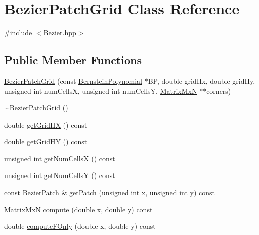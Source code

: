 \hypertarget{class_bezier_patch_grid}{\section{Bezier\-Patch\-Grid Class Reference}
\label{class_bezier_patch_grid}
}


{\ttfamily \#include $<$Bezier.\-hpp$>$}

\subsection*{Public Member Functions}
\begin{DoxyCompactItemize}
\item 
\hyperlink{class_bezier_patch_grid_a554a55115356412abc18baec436188be}{Bezier\-Patch\-Grid} (const \hyperlink{class_bernstein_polynomial}{Bernstein\-Polynomial} $\ast$B\-P, double grid\-Hx, double grid\-Hy, unsigned int num\-Cells\-X, unsigned int num\-Cells\-Y, \hyperlink{class_matrix_mx_n}{Matrix\-Mx\-N} $\ast$$\ast$corners)
\item 
\hyperlink{class_bezier_patch_grid_a2d05668c85a89cc22ecec7527dc61fb6}{$\sim$\-Bezier\-Patch\-Grid} ()
\item 
double \hyperlink{class_bezier_patch_grid_a097dc86c745cf672dae184ba638a575f}{get\-Grid\-H\-X} () const 
\item 
double \hyperlink{class_bezier_patch_grid_a415ab4140e78d397cf102ec7a349c858}{get\-Grid\-H\-Y} () const 
\item 
unsigned int \hyperlink{class_bezier_patch_grid_a68d5e67e34eb2290e3dc66aad978003a}{get\-Num\-Cells\-X} () const 
\item 
unsigned int \hyperlink{class_bezier_patch_grid_a527f5f89d884c8c496b87cd733bd5e57}{get\-Num\-Cells\-Y} () const 
\item 
const \hyperlink{class_bezier_patch}{Bezier\-Patch} \& \hyperlink{class_bezier_patch_grid_a9e9c8bbdad683ca8a9afba393c105223}{get\-Patch} (unsigned int x, unsigned int y) const 
\item 
\hyperlink{class_matrix_mx_n}{Matrix\-Mx\-N} \hyperlink{class_bezier_patch_grid_a255a33e2613464997d2afee32bc549ab}{compute} (double x, double y) const 
\item 
double \hyperlink{class_bezier_patch_grid_afa4d08b2c4e00e9e9a068b5bff86951f}{compute\-F\-Only} (double x, double y) const 
\end{DoxyCompactItemize}


